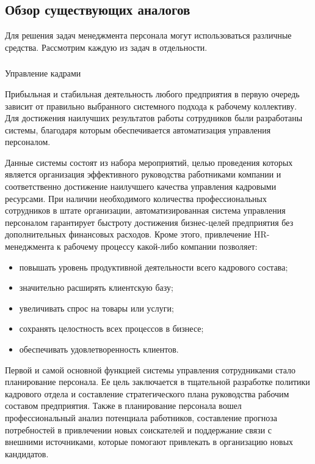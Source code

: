 \subsection{Обзор существующих аналогов}
\label{sec:analysis:analogues}

Для решения задач менеджмента персонала могут использоваться различные средства. Рассмотрим каждую из задач в
отдельности.

\subsubsection{} Управление кадрами
\label{sec:analysis:analogues:managment}

Прибыльная и стабильная деятельность любого предприятия в первую очередь зависит от правильно выбранного системного
подхода к рабочему коллективу. Для достижения наилучших результатов работы сотрудников были разработаны системы,
благодаря которым обеспечивается автоматизация управления персоналом. 

Данные системы состоят из набора мероприятий, целью проведения которых является организация эффективного руководства
работниками компании и соответственно достижение наилучшего качества управления кадровыми ресурсами. При наличии
необходимого количества профессиональных сотрудников в штате организации, автоматизированная система управления
персоналом гарантирует быстроту достижения бизнес-целей предприятия без дополнительных финансовых расходов.
Кроме этого, привлечение HR-менеджмента к рабочему процессу какой-либо компании позволяет:
\begin{itemize}
	\item повышать уровень продуктивной деятельности всего кадрового состава;
	\item значительно расширять клиентскую базу;
	\item увеличивать спрос на товары или услуги;
	\item сохранять целостность всех процессов в бизнесе;
	\item обеспечивать удовлетворенность клиентов.
\end{itemize}

Первой и самой основной функцией системы управления сотрудниками стало планирование персонала. Ее цель заключается в
тщательной разработке политики кадрового отдела и составление стратегического плана руководства рабочим составом
предприятия. Также в планирование персонала вошел профессиональный анализ потенциала работников, составление прогноза
потребностей в привлечении новых соискателей и поддержание связи с внешними источниками, которые помогают привлекать в
организацию новых кандидатов.

